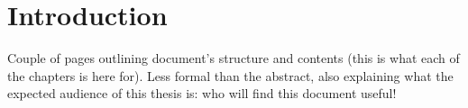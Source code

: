 \chapter*{Introduction}\label{chap:intro}
{\color{blue} Couple of pages outlining document's structure and contents (this is what each of the chapters is here for). Less formal than the abstract, also explaining what the expected audience of this thesis is: who will find this document useful!}